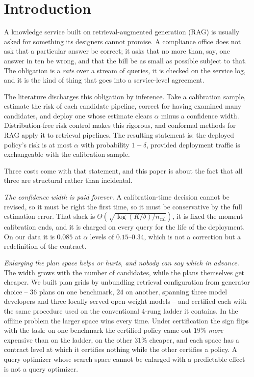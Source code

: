 \section{Introduction}
\label{sec:intro}

A knowledge service built on retrieval-augmented generation (RAG) is
usually asked for something its designers cannot promise. A compliance
office does not ask that a particular answer be correct; it asks that
no more than, say, one answer in ten be wrong, and that the bill be as
small as possible subject to that. The obligation is a \emph{rate} over
a stream of queries, it is checked on the service log, and it is the
kind of thing that goes into a service-level agreement.

The literature discharges this obligation by inference. Take a
calibration sample, estimate the risk of each candidate pipeline,
correct for having examined many candidates, and deploy one whose
estimate clears $\alpha$ minus a confidence width. Distribution-free
risk control \citep{angelopoulos2021ltt,bates2021rcps} makes this
rigorous, and conformal methods for RAG
\citep{li2024traq,kang2024crag} apply it to retrieval pipelines. The
resulting statement is: the deployed policy's risk is at most $\alpha$
with probability $1-\delta$, provided deployment traffic is
exchangeable with the calibration sample.

Three costs come with that statement, and this paper is about the fact
that all three are structural rather than incidental.

\emph{The confidence width is paid forever.} A calibration-time
decision cannot be revised, so it must be right the first time, so it
must be conservative by the full estimation error. That slack is
$\Theta(\sqrt{\log(K/\delta)/n_{\mathrm{cal}}})$, it is fixed the
moment calibration ends, and it is charged on every query for the life
of the deployment. On our data it is $0.085$ at $\alpha$ levels of
$0.15$--$0.34$, which is not a correction but a redefinition of the
contract.

\emph{Enlarging the plan space helps or hurts, and nobody can say which
in advance.} The width grows with the number of candidates, while the
plans themselves get cheaper. We built plan grids by unbundling
retrieval configuration from generator choice -- $36$ plans on one
benchmark, $24$ on another, spanning three model developers and three
locally served open-weight models -- and certified each with the same
procedure used on the conventional $4$-rung ladder it contains. In the
offline problem the larger space wins every time. Under certification
the sign flips with the task: on one benchmark the certified policy came
out $19\%$ \emph{more} expensive than on the ladder, on the other $31\%$
cheaper, and each space has a contract level at which it certifies
nothing while the other certifies a policy. A query optimizer whose
search space cannot be enlarged with a predictable effect is not a query
optimizer.

